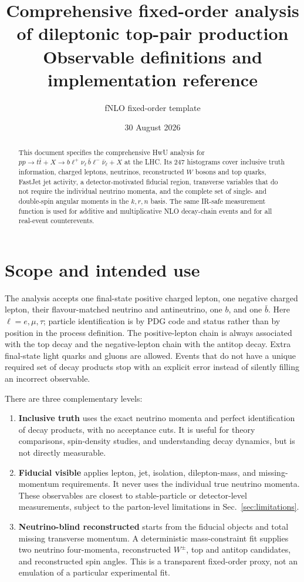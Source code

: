 \documentclass[10pt,a4paper]{article}
\title{Comprehensive fixed-order analysis of dileptonic top-pair production\\
\large Observable definitions and implementation reference}
\author{fNLO fixed-order template}
\date{30 August 2026}
\newcommand{\ttbar}{t\bar t}
\newcommand{\lplus}{\ell^+}
\newcommand{\lminus}{\ell^-}
\newcommand{\code}[1]{\texttt{\detokenize{#1}}}
\begin{document}
\maketitle

\begin{abstract}
This document specifies the comprehensive HwU analysis
\code{analysis_HwU_pp_ttx_dilepton.o} for
\(
 pp\to\ttbar+X\to b\lplus\nu_\ell\,\bar b\lminus\bar\nu_\ell+X
\)
at the LHC.  Its 247 histograms cover inclusive truth information, charged
leptons, neutrinos, reconstructed \(W\) bosons and top quarks, FastJet jet
activity, a detector-motivated fiducial region, transverse variables that do
not require the individual neutrino momenta, and the complete set of single-
and double-spin angular moments in the \(k,r,n\) basis.  The same IR-safe
measurement function is used for additive and multiplicative NLO decay-chain
events and for all real-event counterevents.
\end{abstract}

\tableofcontents

\section{Scope and intended use}

The analysis accepts one final-state positive charged lepton, one negative
charged lepton, their flavour-matched neutrino and antineutrino, one \(b\), and
one \(\bar b\).  Here \(\ell=e,\mu,\tau\); particle identification is by PDG
code and status rather than by position in the process definition.  The
positive-lepton chain is always associated with the top decay and the
negative-lepton chain with the antitop decay.  Extra final-state light quarks
and gluons are allowed.  Events that do not have a unique required set of
decay products stop with an explicit error instead of silently filling an
incorrect observable.

There are three complementary levels:

\begin{enumerate}[leftmargin=1.8em]
\item \textbf{Inclusive truth} uses the exact neutrino momenta and perfect
  identification of decay products, with no acceptance cuts.  It is useful
  for theory comparisons, spin-density studies, and understanding decay
  dynamics, but is not directly measurable.
\item \textbf{Fiducial visible} applies lepton, jet, isolation, dilepton-mass,
  and missing-momentum requirements.  It never uses the individual true
  neutrino momenta.  These observables are closest to stable-particle or
  detector-level measurements, subject to the parton-level limitations in
  Sec.~\ref{sec:limitations}.
\item \textbf{Neutrino-blind reconstructed} starts from the fiducial objects
  and total missing transverse momentum.  A deterministic mass-constraint
  fit supplies two neutrino four-momenta, reconstructed \(W^\pm\), top and
  antitop candidates, and reconstructed spin angles.  This is a transparent
  fixed-order proxy, not an emulation of a particular experimental fit.
\end{enumerate}
\end{document}
